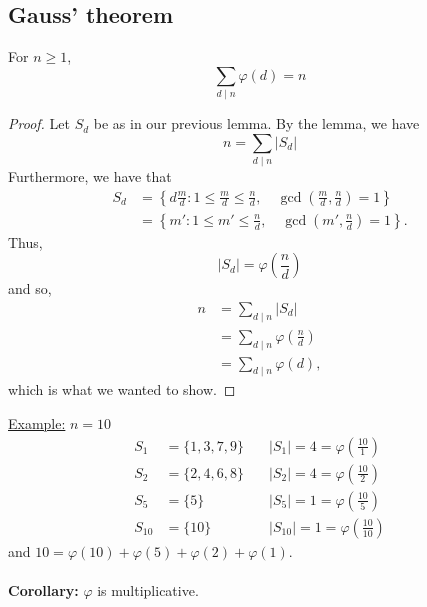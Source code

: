 \documentclass{report}
\begin{document}
\subsection*{Gauss' theorem}
For $n\geq 1$, 
\begin{equation*}
\sum_{d\mid n}\varphi(d)=n
\end{equation*}
\begin{proof}
	Let $S_d$ be as in our previous lemma. By the lemma, we have
	\begin{equation*}
	n=\sum_{d\mid n}\left|S_d\right|
	\end{equation*}
	Furthermore, we have that 
	\begin{equation*}
	\begin{aligned}
	S_d &= \left\{d\frac{m}{d} : 1 \leq \frac{m}{d} \leq \frac{n}{d}, \quad \gcd\left(\frac{m}{d}, \frac{n}{d}\right) = 1\right\}\\
	&=\left\{m' : 1 \leq m' \leq \frac{n}{d}, \quad \gcd\left(m', \frac{n}{d}\right) = 1\right\}.
	\end{aligned}
	\end{equation*}
	Thus, 
	\begin{equation*}
	|S_d| = \varphi(\frac{n}{d})
	\end{equation*}
	and so,
	\begin{equation*}
	\begin{aligned}
	n&=\sum_{d\mid n}\left|S_d\right|\\
	&=\sum_{d\mid n}\varphi(\frac{n}{d})\\
	&=\sum_{d\mid n}\varphi(d),
	\end{aligned}
	\end{equation*}
	which is what we wanted to show.
\end{proof}
\underline{Example:} $n=10$\\
\begin{equation*}
\begin{aligned}
S_1 &= \{1, 3, 7, 9\}\quad &|S_1|= 4 = \varphi(\frac{10}{1})\\
S_2 &= \{2, 4, 6, 8\}\quad &|S_2|= 4 = \varphi(\frac{10}{2})\\
S_5 &= \{5\} \quad &|S_5| = 1 = \varphi(\frac{10}{5})\\
S_10 &= \{10\} \quad &|S_{10}| = 1 = \varphi(\frac{10}{10})
\end{aligned}
\end{equation*}
and $10 = \varphi(10) + \varphi(5) + \varphi(2) + \varphi(1)$.\\
\\
\textbf{Corollary:} $\varphi$ is multiplicative.
\end{document}
